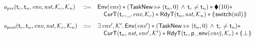 {
    \small
    \[
        \begin{array}{lcl}
            \textit{a}_\textit{pre}(\textsf{t}_c, \textsf{t}_n, \textit{env}, \textit{nst}, \mathcal{K}_c, \mathcal{K}_n) 
            & ::\!\!{=} & 
            \mathsf{Env}({\textit{env}}) *
            ({\mathsf{TaskNew}}\Mapsto{(\textsf{t}_n, 0)} \, \land \, \textsf{t}_c \neq \textsf{t}_n) * 
            \blacklozenge({10}) * \\
            & & \quad 
            \textsf{CurT}({\textsf{t}_c}, {\underline{\ \,}}, {\textit{env}}, {\mathcal{K}_c}) * 
            \textsf{RdyT}({\textsf{t}_n}, {\textit{nst}}, {\mathcal{K}_n}) * 
            \llparenthesis {\, \mathsf{switch}(\text{nil}) \,} \rrparenthesis \\
            \\[-5pt]
            \textit{a}_\textit{post}(\textsf{t}_c, \textsf{t}_n, \textit{env}, \textit{nst}, \mathcal{K}_c, \mathcal{K}_n)
            & ::\!\!{=} & \exists \, \textit{env}', \mathcal{K}'. \, \mathsf{Env}({\textit{env}'}) 
            * ({\mathsf{TaskNew}}\Mapsto{(\textsf{t}_n, 0)} \, \land \, \textsf{t}_c \neq \textsf{t}_n) 
            * \\
            & & 
            \quad 
            \textsf{CurT}({\textsf{t}_n}, {\textit{nst}}, {\textit{env}'}, {\mathcal{K}'}) * 
            \textsf{RdyT}({\textsf{t}_c}, {\mathsf{p\_env}({\textit{env}})}, {\mathcal{K}_c}) * 
            \llparenthesis {\, \perp\,} \rrparenthesis  
        \end{array}
    \]
} 

